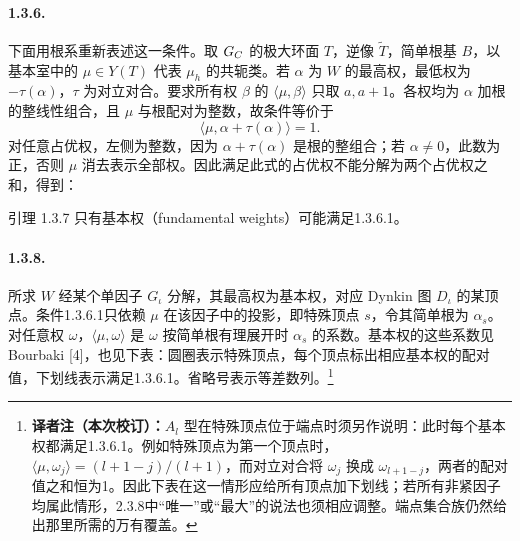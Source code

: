 \paragraph*{1.3.6.} 下面用根系重新表述这一条件。取 $G_{C}$ 的极大环面 $T$，逆像 $\widetilde T$，简单根基 $B$，以基本室中的 $\mu\in Y(T)$ 代表 $\mu_h$ 的共轭类。若 $\alpha$ 为 $W$ 的最高权，最低权为 $-\tau(\alpha)$，$\tau$ 为对立对合。要求所有权 $\beta$ 的 $\langle\mu,\beta\rangle$ 只取 $a,a+1$。各权均为 $\alpha$ 加根的整线性组合，且 $\mu$ 与根配对为整数，故条件等价于
\begin{equation}
 \langle\mu,\alpha+\tau(\alpha)\rangle=1.
 \tag{1.3.6.1}
\end{equation}
对任意占优权，左侧为整数，因为 $\alpha+\tau(\alpha)$ 是根的整组合；若 $\alpha\ne0$，此数为正，否则 $\mu$ 消去表示全部权。因此满足此式的占优权不能分解为两个占优权之和，得到：
\begin{originaltheorem}{引理 1.3.7}
只有基本权（fundamental weights）可能满足1.3.6.1。
\end{originaltheorem}
\paragraph*{1.3.8.} 所求 $W$ 经某个单因子 $G_\iota$ 分解，其最高权为基本权，对应 Dynkin 图 $D_\iota$ 的某顶点。条件1.3.6.1只依赖 $\mu$ 在该因子中的投影，即特殊顶点 $s$，令其简单根为 $\alpha_s$。对任意权 $\omega$，$\langle\mu,\omega\rangle$ 是 $\omega$ 按简单根有理展开时 $\alpha_s$ 的系数。基本权的这些系数见 Bourbaki [4]，也见下表：圆圈表示特殊顶点，每个顶点标出相应基本权的配对值，下划线表示满足1.3.6.1。省略号表示等差数列。\footnote{\textbf{译者注（本次校订）：}$A_l$ 型在特殊顶点位于端点时须另作说明：此时每个基本权都满足1.3.6.1。例如特殊顶点为第一个顶点时，$\langle\mu,\omega_j\rangle=(l+1-j)/(l+1)$，而对立对合将 $\omega_j$ 换成 $\omega_{l+1-j}$，两者的配对值之和恒为1。因此下表在这一情形应给所有顶点加下划线；若所有非紧因子均属此情形，2.3.8中“唯一”或“最大”的说法也须相应调整。端点集合族仍然给出那里所需的万有覆盖。}

